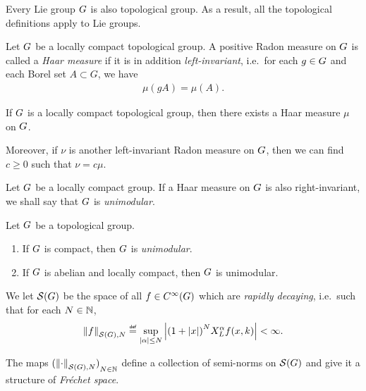 \begin{remark}
    Every Lie group $\Group$ is also topological group.
    As a result, all the topological definitions apply to Lie groups.
\end{remark}

\begin{definition}
    Let $\Group$ be a locally compact topological group.
    A positive Radon measure on $\Group$ is called a \emph{Haar measure}
    if it is in addition \emph{left-invariant},
    i.e.\ for each $g \in \Group$ and each Borel set $A \subset G$, we have
    \begin{align*}
        \mu(g A) = \mu(A).
    \end{align*}
\end{definition}

\begin{proposition}
    If $\Group$ is a locally compact topological group,
    then there exists a Haar measure $\mu$ on $\Group$.

    Moreover, if $\nu$ is another left-invariant Radon measure on $\Group$,
    then we can find $c \geq 0$ such that $\nu = c \mu$.
\end{proposition}

\begin{definition}
\label{definition:unimodular_group}
    Let $\Group$ be a locally compact group.
    If a Haar measure on $\Group$ is also right-invariant,
    we shall say that $\Group$ is \emph{unimodular}.
\end{definition}

\begin{proposition}
\label{proposition:sufficient_conditions_to_be_unimodular}
    Let $\Group$ be a topological group.
    \begin{enumerate}
        \item If $\Group$ is compact, then $\Group$ is \emph{unimodular}.
        \item If $\Group$ is abelian and locally compact, then $\Group$ is unimodular.
    \end{enumerate}
\end{proposition}

\begin{definition}
    We let $\Schwartz\Group$ be the space of all $f \in \SmoothFunctions\Group$
    which are \emph{rapidly decaying},
    i.e.\ such that for each $N \in \N$,
    \begin{align*}
        \seminorm[\Schwartz\Group]{N}{f} \defeq
        \sup_{\abs\alpha \leq N}
        \abs{%
            {(1 + \abs{x})}^N
            \LeftDifferentialOperator{\alpha} f(x, k)
        }
        < \infty.
    \end{align*}

    The maps ${(\seminorm[\Schwartz\Group]{N}{\dummy})}_{N \in \N}$ define a collection of semi-norms on $\Schwartz\Group$
    and give it a structure of \emph{Fr\'echet space}.
\end{definition}

